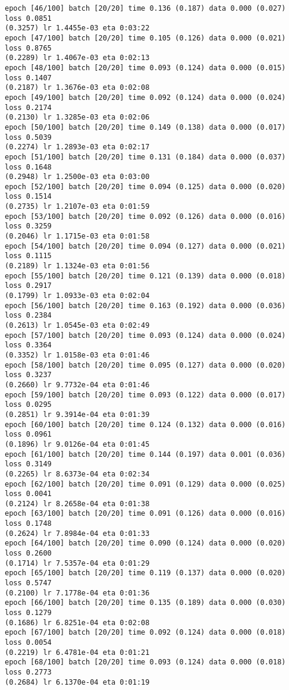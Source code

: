 \documentclass[11pt]{article}
\begin{document}
\begin{Verbatim}[commandchars=\\\{\}]
epoch [46/100] batch [20/20] time 0.136 (0.187) data 0.000 (0.027) loss 0.0851
(0.3257) lr 1.4455e-03 eta 0:03:22
epoch [47/100] batch [20/20] time 0.105 (0.126) data 0.000 (0.021) loss 0.8765
(0.2289) lr 1.4067e-03 eta 0:02:13
epoch [48/100] batch [20/20] time 0.093 (0.124) data 0.000 (0.015) loss 0.1407
(0.2187) lr 1.3676e-03 eta 0:02:08
epoch [49/100] batch [20/20] time 0.092 (0.124) data 0.000 (0.024) loss 0.2174
(0.2130) lr 1.3285e-03 eta 0:02:06
epoch [50/100] batch [20/20] time 0.149 (0.138) data 0.000 (0.017) loss 0.5039
(0.2274) lr 1.2893e-03 eta 0:02:17
epoch [51/100] batch [20/20] time 0.131 (0.184) data 0.000 (0.037) loss 0.1648
(0.2948) lr 1.2500e-03 eta 0:03:00
epoch [52/100] batch [20/20] time 0.094 (0.125) data 0.000 (0.020) loss 0.1514
(0.2735) lr 1.2107e-03 eta 0:01:59
epoch [53/100] batch [20/20] time 0.092 (0.126) data 0.000 (0.016) loss 0.3259
(0.2046) lr 1.1715e-03 eta 0:01:58
epoch [54/100] batch [20/20] time 0.094 (0.127) data 0.000 (0.021) loss 0.1115
(0.2189) lr 1.1324e-03 eta 0:01:56
epoch [55/100] batch [20/20] time 0.121 (0.139) data 0.000 (0.018) loss 0.2917
(0.1799) lr 1.0933e-03 eta 0:02:04
epoch [56/100] batch [20/20] time 0.163 (0.192) data 0.000 (0.036) loss 0.2384
(0.2613) lr 1.0545e-03 eta 0:02:49
epoch [57/100] batch [20/20] time 0.093 (0.124) data 0.000 (0.024) loss 0.3364
(0.3352) lr 1.0158e-03 eta 0:01:46
epoch [58/100] batch [20/20] time 0.095 (0.127) data 0.000 (0.020) loss 0.3237
(0.2660) lr 9.7732e-04 eta 0:01:46
epoch [59/100] batch [20/20] time 0.093 (0.122) data 0.000 (0.017) loss 0.0295
(0.2851) lr 9.3914e-04 eta 0:01:39
epoch [60/100] batch [20/20] time 0.124 (0.132) data 0.000 (0.016) loss 0.0961
(0.1896) lr 9.0126e-04 eta 0:01:45
epoch [61/100] batch [20/20] time 0.144 (0.197) data 0.001 (0.036) loss 0.3149
(0.2265) lr 8.6373e-04 eta 0:02:34
epoch [62/100] batch [20/20] time 0.091 (0.129) data 0.000 (0.025) loss 0.0041
(0.2124) lr 8.2658e-04 eta 0:01:38
epoch [63/100] batch [20/20] time 0.091 (0.126) data 0.000 (0.016) loss 0.1748
(0.2624) lr 7.8984e-04 eta 0:01:33
epoch [64/100] batch [20/20] time 0.090 (0.124) data 0.000 (0.020) loss 0.2600
(0.1714) lr 7.5357e-04 eta 0:01:29
epoch [65/100] batch [20/20] time 0.119 (0.137) data 0.000 (0.020) loss 0.5747
(0.2100) lr 7.1778e-04 eta 0:01:36
epoch [66/100] batch [20/20] time 0.135 (0.189) data 0.000 (0.030) loss 0.1279
(0.1686) lr 6.8251e-04 eta 0:02:08
epoch [67/100] batch [20/20] time 0.092 (0.124) data 0.000 (0.018) loss 0.0054
(0.2219) lr 6.4781e-04 eta 0:01:21
epoch [68/100] batch [20/20] time 0.093 (0.124) data 0.000 (0.018) loss 0.2773
(0.2684) lr 6.1370e-04 eta 0:01:19

\end{Verbatim}
\end{document}
